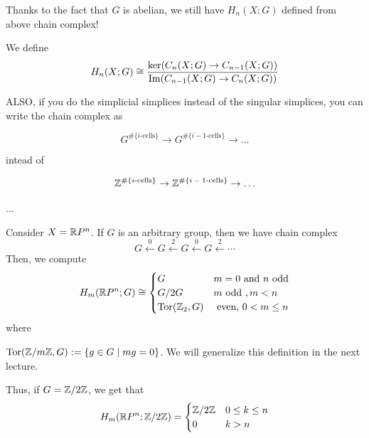 \documentclass[11pt,leqno,oneside]{amsart}
\numberwithin{thm}{section}
\begin{document}
  Thanks to the fact that $G$ is abelian, we still have $H_n(X; G)$
  defined from above chain complex!
  \begin{defn}
    We define \[
      H_n(X;G) \mathrel{\cong} \frac{\ker (C_n(X;G) \to C_{n-1}(X;G))}{\operatorname{Im}
        (C_{n-1}(X;G) \to C_n(X;G))}
    \]
  \end{defn}

  ALSO, if you do the simplicial simplices instead of the singular simplices, you can write the chain complex as

  $$G^{\#\{\text{$i$-cells}\}} \to G^{\#\{\text{$i-1$-cells}\}} \to \ldots$$

  intead of

  $${\mathbb Z}^{\#\{\text{$i$-cells}\}} \to {\mathbb Z}^{\#\{\text{$i-1$-cells}\}} \to \ldots$$

  ...
  \begin{example}
    Consider \(X = {\mathbb R} P^n\). If \(G\) is an arbitrary group, then we
    have chain complex \[
      G \overset{0}{\leftarrow} G \overset{2}{\leftarrow} G \overset{0}{\leftarrow} G \overset{2}{\leftarrow} \cdots 
    \]
    Then, we compute \[
      H_m({\mathbb R} P^n;G) \mathrel{\cong}
      \begin{cases}
        G & m=0 \text{ and } n \text{ odd}\\
        G/2G & m \text{ odd }, m < n\\
        \operatorname{Tor}({\mathbb Z}_2,G) & \text{ even, } 0 < m \leq n
      \end{cases}
    \]
    where
    \begin{defn}
      \(\operatorname{Tor}({\mathbb Z}/m{\mathbb Z},G) := \{g \in G \mid mg = 0\}\). We will generalize
      this definition in the next lecture.
    \end{defn}
    Thus, if \(G = {\mathbb Z}/2{\mathbb Z}\), we get that \[
      H_m({\mathbb R} P^n; {\mathbb Z}/2{\mathbb Z}) =
      \begin{cases}
        {\mathbb Z}/2{\mathbb Z} & 0 \leq k \leq n \\
        0 & k > n
      \end{cases}
    \]
  \end{example}
\end{document}
